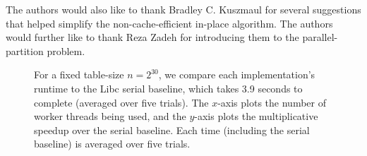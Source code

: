 \documentclass[11pt]{article}
\renewcommand{\paragraph}[1]{\vspace{0.09in}\noindent{\bf \boldmath #1.}}
\theoremstyle{remark}
\theoremstyle{remark}
\begin{document}


The authors would also like to thank Bradley C. Kuszmaul for several
suggestions that helped simplify the non-cache-efficient in-place
algorithm. The authors would further like to thank Reza Zadeh for
introducing them to the parallel-partition problem.


\clearpage




\begin{figure*}
  \begin{center}
    \CILKtable 
  \end{center}
    \caption{For a fixed table-size $n = 2^{30}$, we compare each
      implementation's runtime to the Libc serial baseline, which takes 3.9
      seconds to complete (averaged over five trials). The $x$-axis
      plots the number of worker threads being used, and the $y$-axis
      plots the multiplicative speedup over the serial baseline. Each
      time (including the serial baseline) is averaged over five trials.}
      \label{tablecilk}
\end{figure*}
\end{document}
